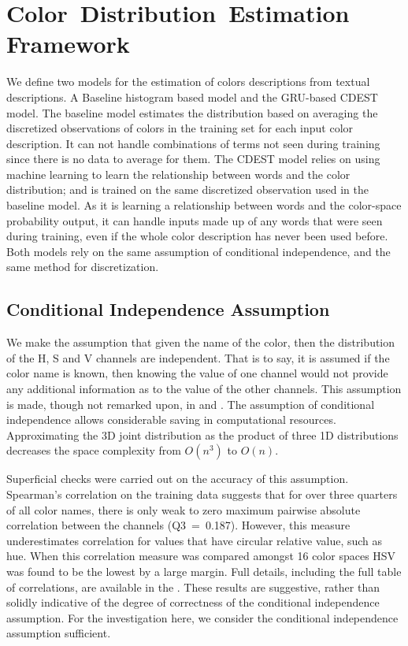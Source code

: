 \documentclass[11pt,letterpaper, twocolumn]{article}
\newcommand{\textcite}{\cite}
\begin{document}
\section{Color~Distribution~Estimation Framework}\label{sec:method}
We define two models for the estimation of colors descriptions from textual descriptions.
A Baseline histogram based model and the GRU-based CDEST model.
The baseline model estimates the distribution based on averaging the discretized observations of colors in the training set for each input color description.
It can not handle combinations of terms not seen during training since there is no data to average for them.
The CDEST model relies on using machine learning to learn the relationship between words and the color distribution; and is trained on the same discretized observation used in the baseline model.
As it is learning a relationship between words and the color-space probability output, it can handle inputs made up of any words that were seen during training, even if the whole color description has never been used before.
Both models rely on the same assumption of conditional independence, and the same method for discretization.


\subsection{Conditional Independence Assumption}\label{sec:conditional-independence-assumption}
We make the assumption that given the name of the color, then the distribution of the H, S and V channels are independent.
That is to say, it is assumed if the color name is known, then  knowing the value of one channel would not provide any additional information as to the value  of the other channels.
This assumption is made, though not remarked upon, in \textcite{meomcmahanstone:color} and \textcite{mcmahan2015bayesian}.
The assumption of conditional independence allows considerable saving in computational resources.
Approximating the 3D joint distribution as the product of three 1D distributions decreases the space complexity from $O(n^3)$ to $O(n)$.


Superficial checks were carried out on the accuracy of this assumption.
Spearman's correlation on the training data suggests that for over three quarters of all color names, there is only weak to zero maximum pairwise absolute correlation between the channels (\mbox{Q3 = 0.187}).
However, this measure underestimates correlation for values that have circular relative value, such as hue.
When this correlation measure was compared amongst 16 color spaces HSV was found to be the lowest by a large margin.
Full details, including the full table of correlations, are available in the .
These results are suggestive, rather than solidly indicative of the degree of correctness of the conditional independence assumption.
For the investigation here, we consider the conditional independence assumption sufficient.
\end{document}
